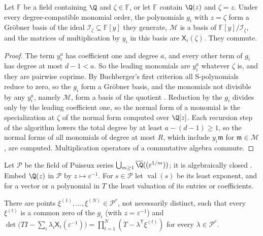 \begin{lemma}\label{lem:int:quotient}
Let $\mathbb F$ be a field containing $\Q$ and $\zeta\in\mathbb F$, or let
$\mathbb F$ contain $\Q(z)$ and $\zeta=z$. Under every degree-compatible monomial
order, the polynomials $g_i$ with $z=\zeta$ form a Gr\"obner basis of the ideal
$\mathcal I_\zeta\subseteq\mathbb F[y]$ they generate, $\mathcal M$ is a basis
of $\mathbb F[y]/\mathcal I_\zeta$, and the matrices of multiplication by $y_i$
in this basis are $\mathsf X_i(\zeta)$. They commute.
\end{lemma}

\begin{proof}
The term $y_i^a$ has coefficient one and degree $a$, and every other term of
$g_i$ has degree at most $d-1<a$. So the leading monomials are $y_i^a$
whatever $\zeta$ is, and they are pairwise coprime. By Buchberger's first
criterion all S-polynomials reduce to zero, so the $g_i$ form a Gr\"obner basis,
and the monomials not divisible by any $y_i^a$, namely $\mathcal M$, form a
basis of the quotient \citep{cox2015-ideals-varieties-and-algorithms}. Reduction by the $g_i$
divides only by the leading coefficient one, so the normal form of a monomial
is the specialization at $\zeta$ of the normal form computed over $\Q[z]$.
Each recursion step of the algorithm lowers the total degree by at least
$a-(d-1)\ge1$, so the normal forms of all monomials of degree at most $R$,
which include $y_i\mathfrak m$ for $\mathfrak m\in\mathcal M$, are computed. Multiplication
operators of a commutative algebra commute.
\end{proof}

Let $\mathcal P$ be the field of Puiseux series
$\bigcup_{m\ge1}\overline\Q((\varepsilon^{1/m}))$; it is algebraically closed
\citep{basu2006-algorithms-in-real-algebraic-geometry}. Embed $\Q(z)$ in $\mathcal P$ by $z\mapsto\varepsilon^{-1}$.
For $s\in\mathcal P$ let $\operatorname{val}(s)$ be its least exponent, and for a
vector or a polynomial in $T$ the least valuation of its entries or
coefficients.

\begin{lemma}\label{lem:int:triangular}
There are points $\xi^{(1)},\ldots,\xi^{(N)}\in\mathcal P^r$, not necessarily
distinct, such that every $\xi^{(t)}$ is a common zero of the $g_i$ (with
$z=\varepsilon^{-1}$) and $\det\bigl(TI-\sum_i\lambda_i\mathsf X_i(\varepsilon^{-1})\bigr)
=\prod_{t=1}^N(T-\lambda^{\mathsf T}\xi^{(t)})$ for every $\lambda\in\mathcal P^r$.
\end{lemma}


